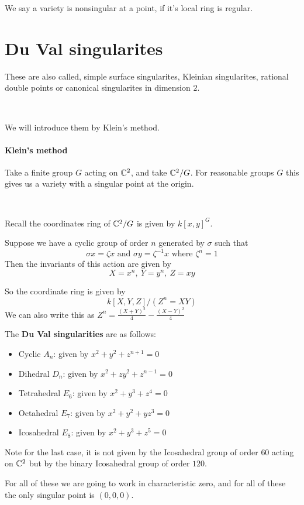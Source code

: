 We say a variety is nonsingular at a point, if it's local ring is regular.

\section{Du Val singularites}
These are also called, simple surface singularites, Kleinian singularites, rational double points or canonical singularites in dimension $2$.


\

We will introduce them by Klein's method.
\paragraph*{Klein's method}
    Take a finite group $G$ acting on $\mathbb{C}^2$, and take $\mathbb{C}^2/G$. For reasonable groups $G$ this gives us a variety with a singular point at the origin.

    \

    Recall the coordinates ring of $\mathbb{C}^2/G$ is given by ${k[x,y]}^G$.


\begin{example}
    Suppose we have a cyclic group of order $n$ generated by $\sigma$ such that \[\sigma x = \zeta x \text{ and }\sigma y = \zeta^{-1} x\text{ where }\zeta^n = 1\]
    Then the invariants of this action are given by \[X = x^n, \ Y = y^n, \ Z = xy\]

    So the coordinate ring is given by \[k[X,Y,Z]/(Z^n = XY)\]
    We can also write this as $Z^n = \frac{{(X+Y)}^2}{4}-\frac{{(X-Y)}^2}{4}$
\end{example}
\begin{definition}
    The \textbf{Du Val singularities} are as follows:\begin{itemize}
        \item Cyclic $A_n$: given by $x^2+y^2+z^{n+1} = 0$
        \item Dihedral $D_n$: given by $x^2+zy^2+z^{n-1} = 0$
        \item Tetrahedral $E_6$: given by $x^2+y^3+z^4 = 0$
        \item Octahedral $E_7$: given by $x^2+y^2+yz^3 = 0$
        \item Icosahedral $E_8$: given by $x^2+y^3+z^5 = 0$
    \end{itemize}
    Note for the last case, it is not given by the Icosahedral group of order $60$ acting on $\mathbb{C}^2$ but by the binary Icosahedral group of order $120$.
\end{definition}
For  all of these we are going to work in characteristic zero, and for all of these the only singular point is $(0,0,0)$.

